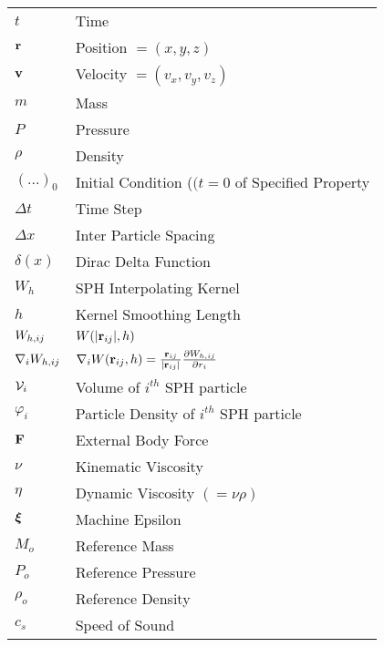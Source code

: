 \begin{longtable}{ll}
$t$                     & Time                              \\
$\vect{r}$              & Position $=(x, y, z)$             \\
$\vect{v}$              & Velocity $=(v_x, v_y, v_z)$       \\
$m$                     & Mass                              \\
$P$                     & Pressure                          \\
$\rho$                  & Density                           \\
$(...)_0$                      & Initial Condition ($(t=0$ of Specified Property                                             \\
$\Delta t$              & Time Step                         \\
$\Delta x$              & Inter Particle Spacing            \\
$\delta (x)$            & Dirac Delta Function              \\
$W_{h}$                 & SPH Interpolating Kernel          \\
$h$                     & Kernel Smoothing Length           \\
$\WIJ$                  & $W(|\RIJ|, h)$                    \\
$\DWIJ$                        & $\nabla_i W(\RIJ,h) = \frac{\RIJ}{\RtwoIJ[]} \PartialDerivative[r_i]{\WIJ}$                 \\
$\Vol_i$                & Volume of $i^{th}$ SPH particle   \\
$\varphi_i$                    & Particle Density of $i^{th}$ SPH particle                                                   \\
$\vect{F}$              & External Body Force               \\
$\nu$                   & Kinematic Viscosity               \\
$\eta$                  & Dynamic Viscosity $(=\nu \rho)$   \\
$\MachineEpsilon$       & Machine Epsilon                   \\
$M_o$                   & Reference Mass                    \\
$P_o$                   & Reference Pressure                \\
$\rho_o$                & Reference Density                 \\
$c_s$                   & Speed of Sound                    \\

\end{longtable}
